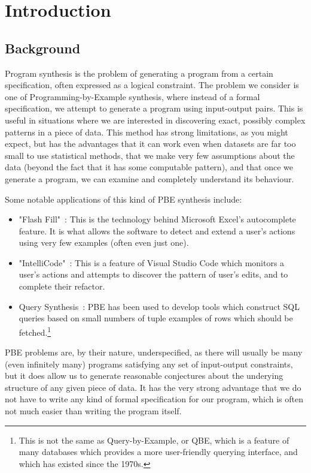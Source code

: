 \section{Introduction}


\subsection{Background}

Program synthesis is the problem of generating a program from a certain specification, often expressed as a logical constraint. The problem we consider is one of Programming-by-Example synthesis, where instead of a formal specification, we attempt to generate a program using input-output pairs. This is useful in situations where we are interested in discovering exact, possibly complex patterns in a piece of data. This method has strong limitations, as you might expect, but has the advantages that it can work even when datasets are far too small to use statistical methods, that we make very few assumptions about the data (beyond the fact that it has some computable pattern), and that once we generate a program, we can examine and completely understand its behaviour.

Some notable applications of this kind of PBE synthesis include:

\begin{itemize}
  \item "Flash Fill"~\cite{gulwani2017program}: This is the technology behind Microsoft Excel's autocomplete feature. It is what allows the software to detect and extend a user's actions using very few examples (often even just one).
  \item "IntelliCode"~\cite{IntelliCode}: This is a feature of Visual Studio Code which monitors a user's actions and attempts to discover the pattern of user's edits, and to complete their refactor.
  \item Query Synthesis~\cite{Shen2014DiscoveringQB}: PBE has been used to develop tools which construct SQL queries based on small numbers of tuple examples of rows which should be fetched.\footnote{This is not the same as Query-by-Example, or QBE, which is a feature of many databases which provides a more user-friendly querying interface, and which has existed since the 1970s.}
\end{itemize}

PBE problems are, by their nature, underspecified, as there will usually be many (even infinitely many) programs satisfying any set of input-output constraints, but it does allow us to generate reasonable conjectures about the underying structure of any given piece of data. It has the very strong advantage that we do not have to write any kind of formal specification for our program, which is often not much easier than writing the program itself.

